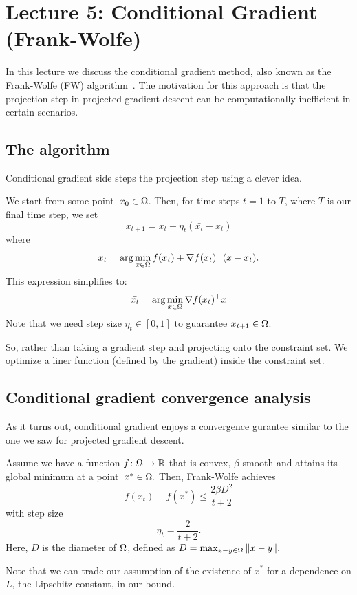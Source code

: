 \section{Lecture 5: Conditional Gradient (Frank-Wolfe)}
In this lecture we discuss the conditional gradient method, also known as the
Frank-Wolfe (FW) algorithm~\cite{Frank1956}. The motivation for this approach is
that the projection step in projected gradient descent can be computationally
inefficient in certain scenarios.

\subsection{The algorithm}
Conditional gradient side steps the projection step using a clever idea.

We start from some point~$x_0\in\Omega$. Then, for time steps $t = 1$ to $T$, 
where $T$ is our final time step, we set
\[
x_{t+1} = x_t + \eta_t(\bar{x_t}-x_t)
\]
where
$$ \bar{x_t} = \arg\min_{x\in \Omega} f(x_t) + \nabla f(x_t) ^\top (x-x_t).$$
This expression simplifies to:
$$ \bar{x_t} = \arg\min_{x\in \Omega} \nabla f(x_t) ^\top x $$
Note that we need step size $\eta_t \in [0,1]$ to guarantee $x_{t+1} \in \Omega$.

So, rather than taking a gradient step and projecting onto the constraint set.
We optimize a liner function (defined by the gradient) inside the constraint
set.

\subsection{Conditional gradient convergence analysis}

As it turns out, conditional gradient enjoys a convergence gurantee similar to
the one we saw for projected gradient descent.

\begin{theorem}
Assume we have a function $f\colon\Omega\to\mathbb{R}$ that is convex, $\beta$-smooth
and attains its global minimum at a point~$x^*\in\Omega.$ Then, Frank-Wolfe achieves
$$ f(x_t) - f(x^*) \leq \frac{2\beta D^2}{t+2}$$
with step size $$\eta_t = \frac{2}{t+2}.$$
Here, $D$ is the diameter of $\Omega$, defined as
$ D = \max_{x-y \in \Omega} \| x-y \|.$ 
\end{theorem}
Note that we can trade our assumption of the existence of $x^*$ for a dependence on $L$, the Lipschitz constant, in our bound.

